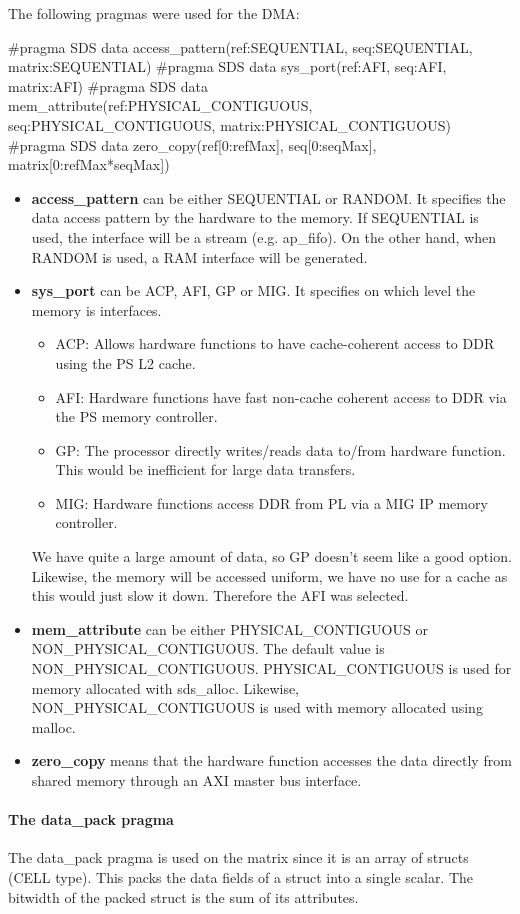 The following pragmas were used for the DMA:
\begin{lcverbatim}
#pragma SDS data access_pattern(ref:SEQUENTIAL, seq:SEQUENTIAL, 
	matrix:SEQUENTIAL)
#pragma SDS data sys_port(ref:AFI, seq:AFI, matrix:AFI)
#pragma SDS data mem_attribute(ref:PHYSICAL_CONTIGUOUS, 
	seq:PHYSICAL_CONTIGUOUS, matrix:PHYSICAL_CONTIGUOUS)
#pragma SDS data zero_copy(ref[0:refMax], seq[0:seqMax], 
	matrix[0:refMax*seqMax])
\end{lcverbatim}
\begin{itemize}
	\item \textbf{access\_pattern} can be either SEQUENTIAL or RANDOM. It specifies the data access pattern by the hardware to the memory. If SEQUENTIAL is used, the interface will be a stream (e.g. ap\_fifo). On the other hand, when RANDOM is used, a RAM interface will be generated.
	\item \textbf{sys\_port} can be ACP, AFI, GP or MIG. It specifies on which level the memory is interfaces. 
	\begin{itemize}
		\item ACP: Allows hardware functions to have cache-coherent access to DDR using the PS L2 cache.
		\item AFI: Hardware functions have fast non-cache coherent access to DDR via the PS memory controller.
		\item GP: The processor directly writes/reads data to/from hardware function. This would be inefficient for large data transfers.
		\item MIG: Hardware functions access DDR from PL via a MIG IP memory controller.
	\end{itemize}
	We have quite a large amount of data, so GP doesn't seem like a good option. Likewise, the memory will be accessed uniform, we have no use for a cache as this would just slow it down. Therefore the AFI was selected.
	\item \textbf{mem\_attribute} can be either PHYSICAL\_CONTIGUOUS or NON\_PHYSICAL\_CONTIGUOUS. The default value is NON\_PHYSICAL\_CONTIGUOUS. PHYSICAL\_CONTIGUOUS is used for memory allocated with sds\_alloc. Likewise, NON\_PHYSICAL\_CONTIGUOUS is used with memory allocated using malloc.
	\item \textbf{zero\_copy} means that the hardware function accesses the data directly from shared memory through an AXI master bus interface.
\end{itemize}

\paragraph{The data\_pack pragma} The data\_pack pragma is used on the matrix since it is an array of structs (CELL type). This packs the data fields of a struct into a single scalar. The bitwidth of the packed struct is the sum of its attributes.

